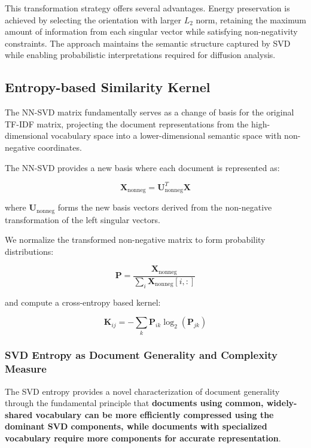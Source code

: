 \documentclass[12pt,a4paper]{article}
\begin{document}
This transformation strategy offers several advantages. Energy preservation is achieved by selecting the orientation with larger $L_2$ norm, retaining the maximum amount of information from each singular vector while satisfying non-negativity constraints. The approach maintains the semantic structure captured by SVD while enabling probabilistic interpretations required for diffusion analysis.

\subsection{Entropy-based Similarity Kernel}
The NN-SVD matrix fundamentally serves as a change of basis for the original TF-IDF matrix, projecting the document representations from the high-dimensional vocabulary space into a lower-dimensional semantic space with non-negative coordinates.

The NN-SVD provides a new basis where each document is represented as:

\begin{equation}
\mathbf{X}_{\text{nonneg}} = \mathbf{U}_{\text{nonneg}}^T \mathbf{X}
\end{equation}

where $\mathbf{U}_{\text{nonneg}}$ forms the new basis vectors derived from the non-negative transformation of the left singular vectors.

We normalize the transformed non-negative matrix to form probability distributions:

\begin{equation}
\mathbf{P} = \frac{\mathbf{X}_{\text{nonneg}}}{\sum_{i} \mathbf{X}_{\text{nonneg}}[i,:]}
\end{equation}

and compute a cross-entropy based kernel:

\begin{equation}
\mathbf{K}_{ij} = -\sum_{k} \mathbf{P}_{ik} \log_2(\mathbf{P}_{jk})
\end{equation}

\subsubsection{SVD Entropy as Document Generality and Complexity Measure}

The SVD entropy provides a novel characterization of document generality through the fundamental principle that \textbf{documents using common, widely-shared vocabulary can be more efficiently compressed using the dominant SVD components, while documents with specialized vocabulary require more components for accurate representation}.
\end{document}
